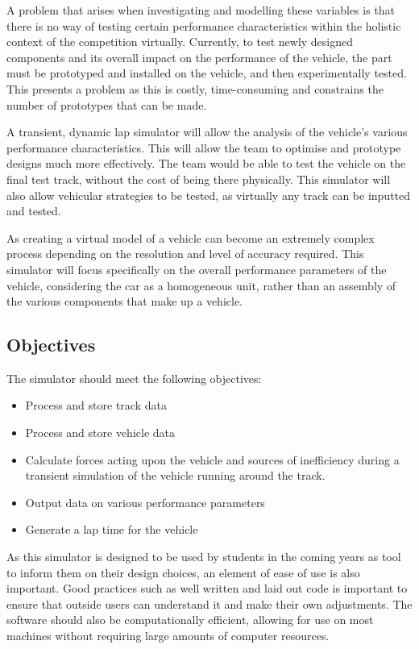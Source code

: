 \documentclass[11pt]{article}
\numberwithin{equation}{section}
\begin{document}
A problem that arises when investigating and modelling these variables is that there is no way of testing certain performance characteristics within the holistic context of the competition virtually. Currently, to test newly designed components and its overall impact on the performance of the vehicle, the part must be prototyped and installed on the vehicle, and then experimentally tested. This presents a problem as this is costly, time-consuming and constrains the number of prototypes that can be made.

A transient, dynamic lap simulator will allow the analysis of the vehicle's various performance characteristics. This will allow the team to optimise and prototype designs much more effectively. The team would be able to test the vehicle on the final test track, without the cost of being there physically. This simulator will also allow vehicular strategies to be tested, as virtually any track can be inputted and tested. 

As creating a virtual model of a vehicle can become an extremely complex process depending on the resolution and level of accuracy required. This simulator will focus specifically on the overall performance parameters of the vehicle, considering the car as a homogeneous unit, rather than an assembly of the various components that make up a vehicle. 
\subsection{Objectives}
The simulator should meet the following objectives:
\begin{itemize}
    \item Process and store track data
    \item Process and store vehicle data
    \item Calculate forces acting upon the vehicle and sources of inefficiency during a transient simulation of the vehicle running around the track.
    \item Output data on various performance parameters
    \item Generate a lap time for the vehicle
\end{itemize}
As this simulator is designed to be used by students in the coming years as tool to inform them on their design choices, an element of ease of use is also important. Good practices such as well written and laid out code is important to ensure that outside users can understand it and make their own adjustments. The software should also be computationally efficient, allowing for use on most machines without requiring large amounts of computer resources. 
\end{document}
